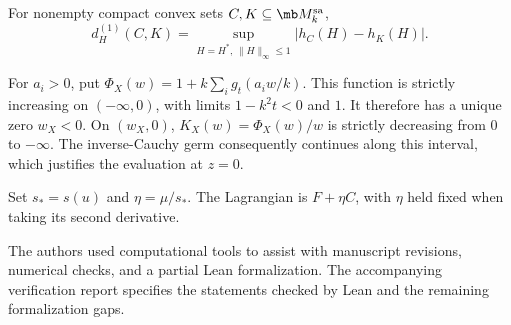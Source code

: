 For nonempty compact convex sets $C,K\subseteq\mb M_k^{\rm sa}$,
\begin{equation}
 d_H^{(1)}(C,K)=
 \sup_{H=H^*,\,\|H\|_\infty\leq1}|h_C(H)-h_K(H)|.
\end{equation}

For $a_i>0$, put $\Phi_X(w)=1+k\sum_i g_t(a_iw/k)$.
This function is strictly increasing on $(-\infty,0)$, with limits
$1-k^2t<0$ and $1$. It therefore has a unique zero $w_X<0$.
On $(w_X,0)$, $K_X(w)=\Phi_X(w)/w$ is strictly decreasing from $0$
to $-\infty$. The inverse-Cauchy germ consequently continues along
this interval, which justifies the evaluation at $z=0$.

Set $s_*=s(u)$ and $\eta=\mu/s_*$. The Lagrangian is $F+\eta C$,
with $\eta$ held fixed when taking its second derivative.

The authors used computational tools to assist with manuscript revisions,
numerical checks, and a partial Lean formalization. The accompanying
verification report specifies the statements checked by Lean and the
remaining formalization gaps.

